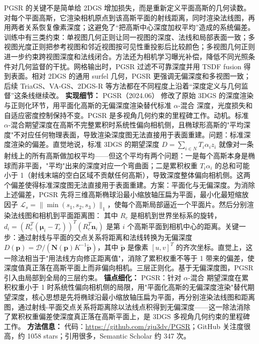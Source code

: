 PGSR 的关键不是简单给 2DGS 增加损失，而是重新定义平面高斯的几何读数。对每个平面高斯，它渲染相机原点到该高斯平面的射线距离，同时渲染法线图，再用两者关系恢复像素深度；这避免了“把高斯中心深度加权平均”造成的系统偏差。训练中有三类约束：单视图几何正则让同一视图的深度、法线和局部表面一致；多视图光度正则把参考视图和邻近视图按可见性重投影后比较颜色；多视图几何正则进一步约束跨视图深度和法线闭合。方法还为相机学习曝光补偿，降低不同光照条件对几何监督的干扰。网格输出时，PGSR 过滤不可靠深度并用 TSDF fusion 得到表面。相对 2DGS 的通用 surfel 几何，PGSR 更强调无偏深度和多视图一致；后续 TriaGS、VA-GS、2DGS-R 等方法都在不同程度上沿着“深度定义与几何监督”这条线继续改。
\textbf{实现细节：} PGSR（2024.06） 修改了原始 3DGS 的深度渲染与正则化环节，用平面化高斯的无偏深度渲染替代标准 $\alpha$-混合 深度，光度损失和自适应密度控制保持不变。PGSR 是多视角几何约束的里程碑工作。动机。标准 $\alpha$-混合期望深度在高斯不完整累积时系统性偏向相机侧，且椭球形高斯的"平均深度"不对应任何物理表面，导致渲染深度图无法直接用于表面重建。问题：标准深度渲染的偏差。直觉地说，标准 3DGS 的期望深度 $D = \sum_{i \in N} T_i \alpha_i z_i$ 就像对一条射线上的所有高斯做加权平均——但这个平均有两个问题：一是每个高斯本身是椭球而非平面，"平均"出来的深度对应一个弯曲面；二是累积权重 $T_i \alpha_i$ 的总和可能小于 1（射线末端的空白区域不贡献任何高斯），导致深度整体偏向相机侧。这两个偏差使得标准深度图无法直接用于表面重建。方案：平面化与无偏深度。为消除上述偏差，PGSR 先将三维高斯椭球沿最小缩放轴压扁为平面，最小化最短缩放因子 $\mathcal{L}_s = \|\min(s_1, s_2, s_3)\|_1$，使每个高斯局部逼近一个平面片。然后分别渲染法线图和相机到平面距离图： 其中 $R_c$ 是相机到世界坐标系的旋转，$d_i = (R_c^T(\bm{\mu}_i - T_c))^T(R_c^T \bm{n}_i)$ 是第 $i$ 个高斯平面到相机中心的距离。关键一步：通过射线与平面的交点关系将距离和法线转换为无偏深度 $D(\bm{p}) = \mathcal{D} / (\bm{N}(\bm{p}) K^{-1} \tilde{\bm{p}})$，其中 $\tilde{\bm{p}}$ 是像素 $[u,v]^T$ 的齐次坐标。直觉上，这一除法相当于"用法线方向修正距离值"，消除了累积权重不等于 1 带来的偏差，使深度值真正落在高斯平面上而非偏向相机。三层正则化。基于无偏深度图，PGSR 引入由局部到全局的三层约束。
\textbf{锚点细化：} PGSR：针对 $\alpha$-混合 期望深度在累积权重小于 1 时系统性偏向相机侧的局限，用"平面化高斯的无偏深度渲染"替代期望深度，核心思想是先将椭球沿最小缩放轴压扁为平面，再分别渲染法线图和距离图，通过射线-平面交点关系将距离除以法线点积得到无偏深度——这一除法消除了累积权重偏差使深度真正落在高斯平面上，是 3DGS 多视角几何约束的里程碑工作。
\textbf{方法信息：} 代码：\url{https://github.com/zju3dv/PGSR}；GitHub 关注度很高，约 1058 stars；引用很多，Semantic Scholar 约 347 次。



